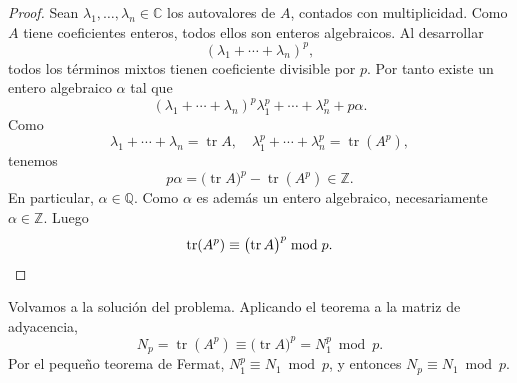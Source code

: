 \documentclass[11pt]{amsproc}
\begin{document}
\begin{proof}
Sean $\lambda_1,\dots,\lambda_n\in\mathbb C$ los autovalores de $A$,
contados con multiplicidad. Como $A$ tiene coeficientes enteros, todos ellos
son enteros algebraicos.
Al desarrollar
\[
(\lambda_1+\cdots+\lambda_n)^p,
\]
todos los términos mixtos tienen coeficiente divisible por $p$. Por tanto
existe un entero algebraico $\alpha$ tal que
\[
(\lambda_1+\cdots+\lambda_n)^p
\lambda_1^p+\cdots+\lambda_n^p+p\alpha.
\]
Como 
\[
\lambda_1+\cdots+\lambda_n=\operatorname{tr}A,\quad 
\lambda_1^p+\cdots+\lambda_n^p=\operatorname{tr}(A^p),
\]
tenemos 
\[
p\alpha=
\bigl(\operatorname{tr}A\bigr)^p-\operatorname{tr}(A^p)\in\mathbb Z.
\]
En particular, $\alpha\in\mathbb Q$. Como $\alpha$ es además un entero
algebraico, necesariamente $\alpha\in\mathbb Z$. Luego 
\[
\operatorname{tr}(A^p)\equiv
\bigl(\operatorname{tr}A\bigr)^p\bmod p.\qedhere 
\]
\end{proof}

Volvamos a la solución del problema. 
Aplicando el teorema a la matriz de adyacencia, 
\[
N_p=\operatorname{tr}(A^p)
\equiv \bigl(\operatorname{tr}A\bigr)^p
=N_1^p\bmod p.
\]
Por el pequeño teorema de Fermat,
$N_1^p\equiv N_1\bmod p$, y entonces 
$N_p\equiv N_1\bmod p$. 
\end{document}
